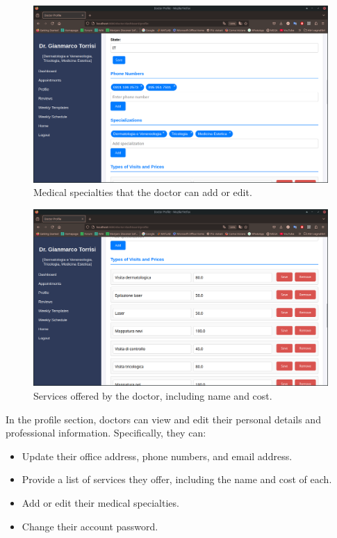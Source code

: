 \begin{figure}[!h]
	\centering
	\includegraphics[scale=0.30]{resources/screenshots/doctor_ui/specializations.png}
	\caption{Medical specialties that the doctor can add or edit.}
	\label{fig:doctor_specialties}
\end{figure}

\begin{figure}[!h]
	\centering
	\includegraphics[scale=0.30]{resources/screenshots/doctor_ui/services.png}
	\caption{Services offered by the doctor, including name and cost.}
	\label{fig:doctor_services}
\end{figure}

In the profile section, doctors can view and edit their personal details and professional information. Specifically, they can:
\begin{itemize}
	\item Update their office address, phone numbers, and email address.
	\item Provide a list of services they offer, including the name and cost of each.
	\item Add or edit their medical specialties.
	\item Change their account password.
\end{itemize}

